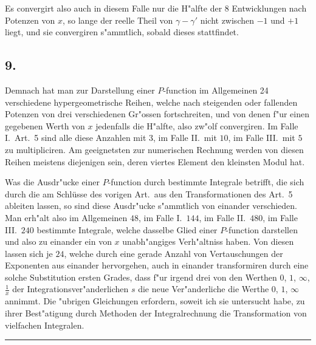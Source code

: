 \documentclass[12pt,a4paper]{book}
\theoremstyle{definition}
\theoremstyle{remark}
\begin{document}
Es convergirt also auch in diesem Falle nur die H{"a}lfte der 8 Entwicklungen nach Potenzen von $x$, so lange der reelle Theil von $\gamma - \gamma'$ nicht zwischen $-1$ und $+1$ liegt, und sie convergiren s{"a}mmtlich, sobald dieses stattfindet.

\subsection*{9.}

Demnach hat man zur Darstellung einer $P$-function im Allgemeinen 24 verschiedene hypergeometrische Reihen, welche nach steigenden oder fallenden Potenzen von drei verschiedenen Gr{"o}ssen fortschreiten, und von denen f{"u}r einen gegebenen Werth von $x$ jedenfalls die H{"a}lfte, also zw{"o}lf convergiren. Im Falle I.\ Art.~5 sind alle diese Anzahlen mit $3$, im Falle II.\ mit $10$, im Falle III.\ mit $5$ zu multipliciren. Am geeignetsten zur numerischen Rechnung werden von diesen Reihen meistens diejenigen sein, deren viertes Element den kleinsten Modul hat.

Was die Ausdr{"u}cke einer $P$-function durch bestimmte Integrale betrifft, die sich durch die am Schlüsse des vorigen Art.\ aus den Transformationen des Art.~5 ableiten lassen, so sind diese Ausdr{"u}cke s{"a}mmtlich von einander verschieden. Man erh{"a}lt also im Allgemeinen $48$, im Falle I.\ $144$, im Falle II.\ $480$, im Falle III.\ $240$ bestimmte Integrale, welche dasselbe Glied einer $P$-function darstellen und also zu einander ein von $x$ unabh{"a}ngiges Verh{"a}ltniss haben. Von diesen lassen sich je $24$, welche durch eine gerade Anzahl von Vertauschungen der Exponenten aus einander hervorgehen, auch in einander transformiren durch eine solche Substitution ersten Grades, dass f{"u}r irgend drei von den Werthen $0$, $1$, $\infty$, $\frac{1}{x}$ der Integrationsver{"a}nderlichen $s$ die neue Ver{"a}nderliche die Werthe $0$, $1$, $\infty$ annimmt. Die {"u}brigen Gleichungen erfordern, soweit ich sie untersucht habe, zu ihrer Best{"a}tigung durch Methoden der Integralrechnung die Transformation von vielfachen Integralen.

\vspace{2em}
\begin{center}
\rule{0.5\textwidth}{0.4pt}
\end{center}
\vspace{1em}

\end{document}
